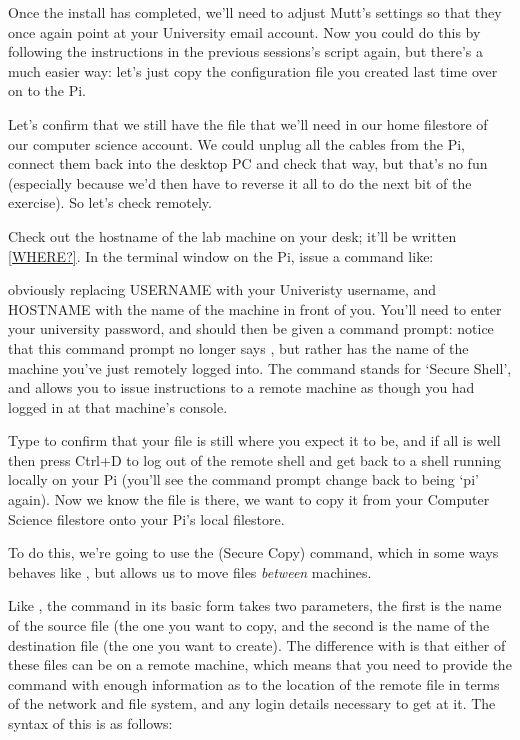Once the install has completed, we'll need to adjust Mutt's settings so that they once again point at your University email account. Now you could do this by following the instructions in the previous sessions's script again, but there's a much easier way: let's just copy the configuration file you created last time over on to the Pi. 

Let's confirm that we still have the  file that we'll need in our home filestore of our computer science account. We could unplug all the cables from the Pi, connect them back into the desktop PC and check that way, but that's no fun (especially because we'd then have to reverse it all to do the next bit of the exercise). So let's check remotely. 

Check out the hostname of the lab machine on your desk; it'll be written \ref{WHERE?}. In the terminal window on the Pi, issue a command like:


obviously replacing USERNAME with your Univeristy username, and HOSTNAME with the name of the machine in front of you. You'll need to enter your university password, and should then be given a command prompt: notice that this command prompt no longer says , but rather has the name of the machine you've just remotely logged into. The  command stands for `Secure Shell', and allows you to issue instructions to a remote machine as though you had logged in at that machine's console.

Type  to confirm that your  file is still where you expect it to be, and if all is well then press Ctrl+D to log out of the remote shell and get back to a shell running locally on your Pi (you'll see the command prompt change back to being `pi' again). Now we know the file is there, we want to copy it from your Computer Science filestore onto your Pi's local filestore.

To do this, we're going to use the  (Secure Copy) command, which in some ways behaves like , but allows us to move files \textit{between} machines. 

Like , the  command in its basic form takes two parameters, the first is the name of the source file (the one you want to copy, and the second is the name of the destination file (the one you want to create). The difference with  is that either of these files can be on a remote machine, which means that you need to provide the command with enough information as to the location of the remote file in terms of the network and file system, and any login details necessary to get at it. The syntax of this is as follows:

